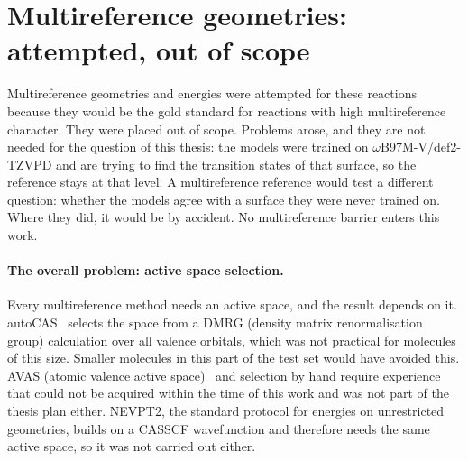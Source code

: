 
\section{Multireference geometries: attempted, out of scope}
\label{sec:mr-whynotmr}

Multireference geometries and energies were attempted for these reactions
because they would be the gold standard for reactions with high
multireference character. They were placed out of scope. Problems arose,
and they are not needed for the question of this thesis: the models were
trained on \mbox{$\omega$B97M-V/def2-TZVPD} and are trying to find the
transition states of that surface, so the reference stays at that level.
A multireference reference
would test a different question: whether the models agree with a
surface they were never trained on. Where they did, it would be by
accident. No multireference barrier enters this work.

\paragraph{The overall problem: active space selection.} Every
multireference method needs an active space, and the result depends on
it. autoCAS~\cite{stein2019autocas} selects the space from a DMRG
(density matrix renormalisation group) calculation over all valence orbitals, which was not practical for
molecules of this size. Smaller molecules in this part of the test set
would have avoided this. AVAS (atomic valence active space)~\cite{sayfutyarova2017} and selection by
hand require experience that could not be acquired within the time of
this work and was not part of the thesis plan either. NEVPT2, the
standard protocol for energies on unrestricted geometries, builds on a
CASSCF wavefunction and therefore needs the same active space, so it
was not carried out either.

